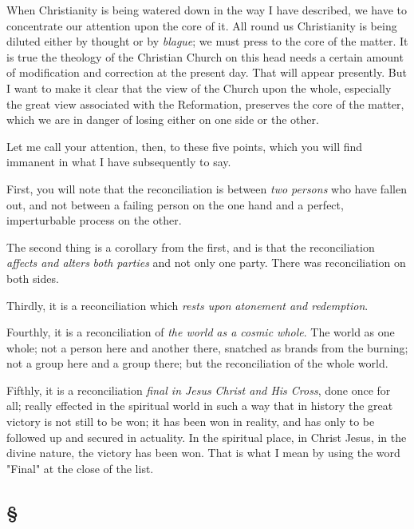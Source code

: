 \documentclass[draft]{ptfdoc}
\begin{document}
When Christianity is being watered down in 
the way I have described, we have to concentrate 
our attention upon the core of it. All 
round us Christianity is being diluted either 
by thought or by \textit{blague}; we must press to the 
core of the matter. It is true the theology of 
the Christian Church on this head needs a 
certain amount of modification and correction 
at the present day. That will appear presently. 
But I want to make it clear that the view of 
the Church upon the whole, especially the 
great view associated with the Reformation, 
preserves the core of the matter, which we 
are in danger of losing either on one side or 
the other. 

Let me call your attention, then, to these 
five points, which you will find immanent in 
what I have subsequently to say. 

First, you will note that the reconciliation is 
between \textit{two persons} who have fallen out, and 
not between a failing person on the one hand 
and a perfect, imperturbable process on the 
other. 

The second thing is a corollary from the first, 
and is that the reconciliation \textit{affects and alters} 
\textit{both parties} and not only one party. There 
was reconciliation on both sides. 

Thirdly, it is a reconciliation which \textit{rests upon} 
\textit{atonement and redemption}. 

Fourthly, it is a reconciliation of \textit{the world} 
\textit{as a cosmic whole}. The world as one whole; 
not a person here and another there, snatched 
as brands from the burning; not a group here 
and a group there; but the reconciliation of 
the whole world. 

Fifthly, it is a reconciliation \textit{final in Jesus} 
\textit{Christ and His Cross}, done once for all; really 
effected in the spiritual world in such a way 
that in history the great victory is not still to 
be won; it has been won in reality, and has 
only to be followed up and secured in actuality. 
In the spiritual place, in Christ Jesus, 
in the divine nature, the victory has been 
won. That is what I mean by using the 
word "Final" at the close of the list. 

\subsection*{
\S
}
\end{document}
